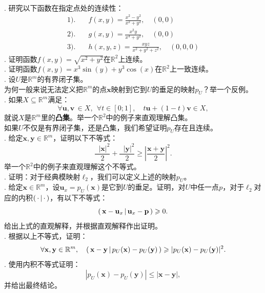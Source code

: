 \documentclass[12pt,UTF8]{ctexbook}
\begin{document}
\begin{xt}
    \mbox{} \\
    . 研究以下函数在指定点处的连续性：
    \begin{align*}
    1).& \quad f(x, y) = \frac{x^2-y^2}{x^2+y^2}, \quad (0, 0) \\
    2).& \quad g(x, y) = \frac{x^2y}{x^4+y^2}, \quad (0, 0) \\
    3).& \quad h(x, y, z) = \frac{xyz}{x^2+y^2+z^2}, \quad (0, 0, 0)
    \end{align*}
    . 证明函数$f(x, y) = \sqrt{x^2+y^2}$在$\mathbb{R}^2$上连续。\\
    . 证明函数$f(x, y) = x^3\sin(y) + y^3\cos(x)$在$\mathbb{R}^2$上一致连续。\\
    . 设$U$是$\mathbb{R}^m$的有界闭子集。\\
     为何一般来说无法定义把$\mathbb{R}^m$的点$\mathbf{x}$映射到它到$U$的垂足的映射$p_U$？举一个反例。\\
    . 如果$X\subseteq \mathbb{R}^m$满足：
    $$ \forall \mathbf{u}, \mathbf{v}\, \in X, \;\, \forall t\in[0;1], \quad t\mathbf{u} + (1 - t)\mathbf{v} \in X,$$
    就说$X$是$\mathbb{R}^m$里的\textbf{凸集}。举一个$\mathbb{R}^2$中的例子来直观理解凸集。\\
    \indent 如果$U$不仅是有界闭子集，还是凸集，我们希望证明$p_U$存在且连续。\\
    . 给定$\mathbf{x}, \mathbf{y}\in \mathbb{R}^m$，证明以下不等式：
    $$ \frac{\phantom{0}|\mathbf{x}|^2}{2}  + \frac{\phantom{0}|\mathbf{y}|^2}{2}  \geqslant \left|\frac{\mathbf{x} + \mathbf{y}}{2}\right|^2. $$
    举一个$\mathbb{R}^2$中的例子来直观理解这个不等式。\\
    . 证明：对于经典模映射$\ell_2$，我们可以定义上述的映射$p_U$。\\
    . 给定$\mathbf{x}\in\mathbb{R}^m$，设$\mathbf{u}_x = p_U(\mathbf{x})$是它到$U$的垂足。证明，对$U$中任一点$p$，对于$\ell_2$对应的内积$\displaystyle\left( \,\cdot \,\middle\vert \,\cdot \,\right)$，有以下不等式：
    $$ \displaystyle\left( \,\mathbf{x} - \mathbf{u}_x \,\middle\vert \,\mathbf{u}_x - \mathbf{p} \,\right) \geqslant 0.$$
    给出上式的直观解释，并根据直观解释作出证明。\\
    . 根据以上不等式，证明：
    $$ \forall \mathbf{x}, \mathbf{y} \in \mathbb{R}^m, \quad \displaystyle\left( \,\mathbf{x} - \mathbf{y} \,\middle\vert \,p_U(\mathbf{x}) - p_U(\mathbf{y}) \,\right) \geqslant |p_U(\mathbf{x}) - p_U(\mathbf{y})|^2. $$
    . 使用内积不等式证明：
    $$ |p_U(\mathbf{x}) - p_U(\mathbf{y})| \leqslant |\mathbf{x} - \mathbf{y}|, $$
    并给出最终结论。
\end{xt}
\end{document}
